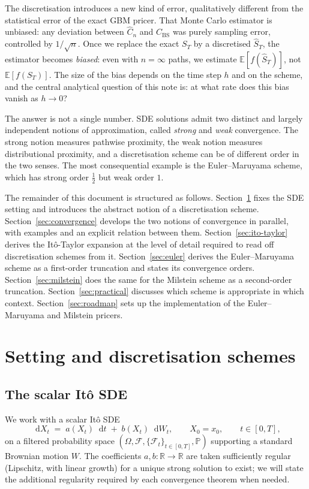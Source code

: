\documentclass[11pt,a4paper]{article}
\theoremstyle{plain}
\theoremstyle{definition}
\theoremstyle{remark}
\newcommand{\R}{\mathbb{R}}
\newcommand{\E}{\mathbb{E}}
\newcommand{\F}{\mathcal{F}}
\newcommand{\Prob}{\mathbb{P}}
\newcommand{\dd}{\mathop{}\!\mathrm{d}}
\begin{document}
The discretisation introduces a new kind of error, qualitatively
different from the statistical error of the exact GBM pricer. That Monte Carlo
estimator is unbiased: any deviation between $\hat C_n$ and
$C_{\mathrm{BS}}$ was purely sampling error, controlled by $1/\sqrt{n}$.
Once we replace the exact $S_T$ by a discretised $\hat S_T$, the
estimator becomes \emph{biased}: even with $n = \infty$ paths, we
estimate $\E[f(\hat S_T)]$, not $\E[f(S_T)]$. The size of the bias
depends on the time step $h$ and on the scheme, and the central
analytical question of this note is: at what rate does this bias
vanish as $h \to 0$?

The answer is not a single number. SDE solutions admit two distinct
and largely independent notions of approximation, called \emph{strong}
and \emph{weak} convergence. The strong notion measures pathwise
proximity, the weak notion measures distributional proximity, and a
discretisation scheme can be of different order in the two senses.
The most consequential example is the Euler--Maruyama scheme, which
has strong order $\tfrac{1}{2}$ but weak order $1$.

The remainder of this document is structured as follows.
Section~\ref{sec:setting} fixes the SDE setting and introduces the
abstract notion of a discretisation scheme.
Section~\ref{sec:convergence} develops the two notions of convergence
in parallel, with examples and an explicit relation between them.
Section~\ref{sec:ito-taylor} derives the It\^o-Taylor expansion at the
level of detail required to read off discretisation schemes from it.
Section~\ref{sec:euler} derives the Euler--Maruyama scheme as a
first-order truncation and states its convergence orders.
Section~\ref{sec:milstein} does the same for the Milstein scheme as a
second-order truncation. Section~\ref{sec:practical} discusses which
scheme is appropriate in which context. Section~\ref{sec:roadmap}
sets up the implementation of the Euler--Maruyama and Milstein pricers.

\section{Setting and discretisation schemes}
\label{sec:setting}

\subsection{The scalar It\^o SDE}

We work with a scalar It\^o SDE
\begin{equation}
\label{eq:sde}
\dd X_t \;=\; a(X_t) \dd t \;+\; b(X_t) \dd W_t,
\qquad X_0 = x_0,
\qquad t \in [0, T],
\end{equation}
on a filtered probability space $(\Omega, \F, \{\F_t\}_{t \in [0,T]},
\Prob)$ supporting a standard Brownian motion $W$. The coefficients
$a, b: \R \to \R$ are taken sufficiently regular (Lipschitz, with
linear growth) for a unique strong solution to exist; we will state
the additional regularity required by each convergence theorem when
needed.
\end{document}
